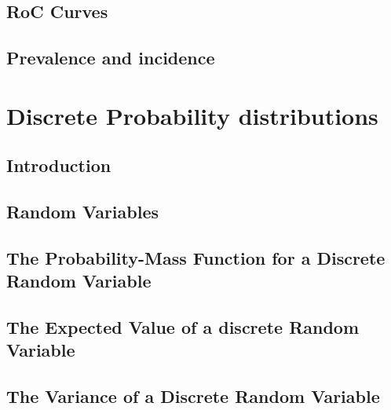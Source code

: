 \documentclass[12pt,]{article}
\begin{document}
\hypertarget{roc-curves}{%
\subsection{RoC Curves}\label{roc-curves}}

\hypertarget{prevalence-and-incidence}{%
\subsection{Prevalence and incidence}\label{prevalence-and-incidence}}

\hypertarget{discrete-probability-distributions}{%
\section{Discrete Probability
distributions}\label{discrete-probability-distributions}}

\hypertarget{introduction}{%
\subsection{Introduction}\label{introduction}}

\hypertarget{random-variables}{%
\subsection{Random Variables}\label{random-variables}}

\hypertarget{the-probability-mass-function-for-a-discrete-random-variable}{%
\subsection{The Probability-Mass Function for a Discrete Random
Variable}\label{the-probability-mass-function-for-a-discrete-random-variable}}

\hypertarget{the-expected-value-of-a-discrete-random-variable}{%
\subsection{The Expected Value of a discrete Random
Variable}\label{the-expected-value-of-a-discrete-random-variable}}

\hypertarget{the-variance-of-a-discrete-random-variable}{%
\subsection{The Variance of a Discrete Random
Variable}\label{the-variance-of-a-discrete-random-variable}}
\end{document}
